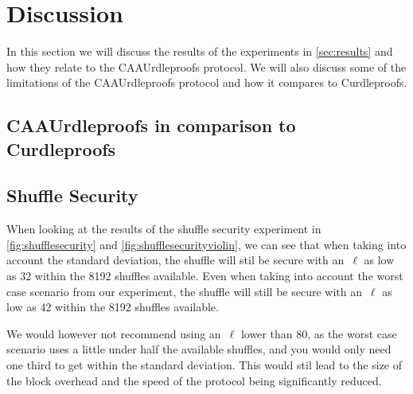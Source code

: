 

\section{Discussion}\label{sec:discussion}
In this section we will discuss the results of the experiments in \autoref{sec:results} and how they relate to the CAAUrdleproofs protocol.
We will also discuss some of the limitations of the CAAUrdleproofs protocol and how it compares to Curdleproofs.


\subsection{CAAUrdleproofs in comparison to Curdleproofs}\label{subsec:CAAUrdleproofs-vs-Curdleproofs}




\subsection{Shuffle Security}\label{subsec:Discution-Shuffle-security}
When looking at the results of the shuffle security experiment in \autoref{fig:shufflesecurity} and \autoref{fig:shufflesecurityviolin}, we can see that when taking into account the standard deviation, the shuffle will stil be secure with an~$\ell$ as low as 32 within the 8192 shuffles available.
Even when taking into account the worst case scenario from our experiment, the shuffle will still be secure with an~$\ell$ as low as 42 within the 8192 shuffles available.

We would however not recommend using an~$\ell$ lower than 80, as the worst case scenario uses a little under half the available shuffles, and you would only need one third to get within the standard deviation.
This would stil lead to the size of the block overhead and the speed of the protocol being significantly reduced.



